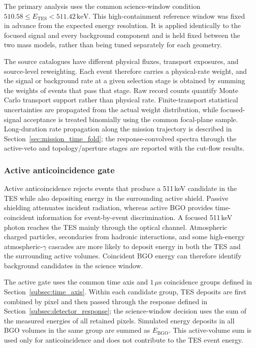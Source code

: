 \documentclass[11pt]{article}
\newcommand{\keV}{\ensuremath{\,\mathrm{keV}}}
\begin{document}
The primary analysis uses the common science-window condition
$510.58\leq E_{\mathrm{TES}}<511.42\keV$. This
high-containment reference window was fixed in advance from the expected energy
resolution. It is applied identically to the focused signal and every background
component and is held fixed between the two mass models, rather than being tuned
separately for each geometry.



The source catalogues have different physical fluxes, transport exposures, and
source-level reweighting. Each event therefore carries a physical-rate weight,
and the signal or background rate at a given selection stage is obtained by
summing the weights of events that pass that stage. Raw record counts quantify
Monte Carlo transport support rather than physical rate. Finite-transport
statistical uncertainties are propagated from the actual weight distribution,
while focused-signal acceptance is treated binomially using the common focal-plane
sample. Long-duration rate propagation along the mission trajectory is described
in Section~\ref{sec:mission_time_fold}; the response-convolved spectra through
the active-veto and topology/aperture stages are reported with the cut-flow results.

\subsubsection{Active anticoincidence gate}

Active anticoincidence rejects events that produce a 511\,keV candidate in the
TES while also depositing energy in the surrounding active shield. Passive
shielding attenuates incident radiation, whereas active BGO provides
time-coincident information for event-by-event discrimination. A focused
511\,keV photon reaches the TES mainly through the optical channel. Atmospheric
charged particles, secondaries from hadronic interactions, and some
high-energy atmospheric-$\gamma$ cascades are more likely to deposit energy in both the TES
and the surrounding active volumes. Coincident BGO energy can therefore
identify background candidates in the science window.

The active gate uses the common time axis and $1\,\mu\mathrm{s}$ coincidence
groups defined in Section~\ref{subsec:time_axis}. Within each candidate group,
TES deposits are first combined by pixel and then passed through the response
defined in Section~\ref{subsec:detector_response}; the science-window decision
uses the sum of the measured energies of all retained pixels. Simulated energy
deposits in all BGO volumes in the same group are summed as
$E_{\mathrm{BGO}}$. This active-volume sum is used only for anticoincidence and
does not contribute to the TES event energy.
\end{document}
